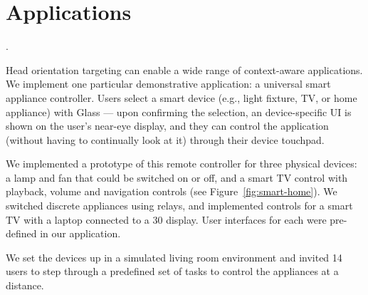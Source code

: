 \section{Applications}
\label{sec:applications}

.

Head orientation targeting can enable a wide range of context-aware applications. We implement one particular demonstrative application: a universal smart appliance controller. Users select a smart device (e.g., light fixture, TV, or home appliance) with Glass --- upon confirming the selection, an device-specific UI is shown on the user's near-eye display, and they can control the application (without having to continually look at it) through their device touchpad.

We implemented a prototype of this remote controller for three physical devices: a lamp and fan that could be switched on or off, and a smart TV control with playback, volume and navigation controls (see Figure~\ref{fig:smart-home}). We switched discrete appliances using relays, and implemented controls for a smart TV with a laptop connected to a 30\inch{} display. User interfaces for each were pre-defined in our application.

We set the devices up in a simulated living room environment and invited 14 users to step through a predefined set of tasks to control the appliances at a distance. 



